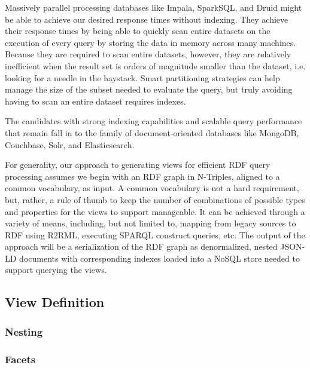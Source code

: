 Massively parallel processing databases like Impala, SparkSQL, and Druid might be able to achieve our desired response times without indexing. 
They achieve their response times by being able to quickly scan entire datasets on the execution of every query by storing the data in memory across many machines.  
Because they are required to scan entire datasets, however, they are relatively inefficient when the result set is orders of magnitude smaller than the dataset, i.e. looking for a needle in the haystack.  
Smart partitioning strategies can help manage the size of the subset needed to evaluate the query, but truly avoiding having to scan an entire dataset requires indexes. 

The candidates with strong indexing capabilities and scalable query performance that remain fall in to the family of document-oriented databases like MongoDB, Couchbase, Solr, and Elasticsearch.  


For generality, our approach to generating views for efficient RDF query processing assumes we begin with an RDF graph in N-Triples, aligned to a common vocabulary, as input.  
A common vocabulary is not a hard requirement, but, rather, a rule of thumb to keep the number of combinations of possible types and properties for the views to support manageable.
It can be achieved through a variety of means, including, but not limited to, mapping from legacy sources to RDF using R2RML, executing SPARQL construct queries, etc. 
The output of the approach will be a serialization of the RDF graph as denormalized, nested JSON-LD documents with corresponding indexes loaded into a NoSQL store needed to support querying the views. 

\subsection{View Definition}
\subsubsection{Nesting}
\subsubsection{Facets}
